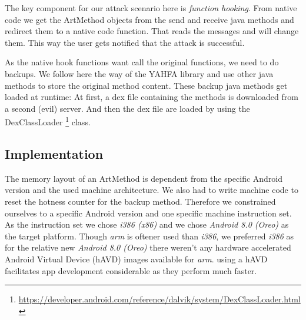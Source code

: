 The key component for our attack scenario here is \emph{function hooking}.
From native code we get the ArtMethod objects from the send and receive java methods and redirect them to a native code function. That reads the messages and will change them. This way the user gets notified that the attack is successful. 

As the native hook functions want call the original functions, we need to do backups. We follow here the way of the YAHFA library and use other java methods to store the original method content. These backup java methods get loaded at runtime: At first, a dex file containing the methods is downloaded from a second (evil) server. And then the dex file are loaded by using the DexClassLoader \footnote{\url{https://developer.android.com/reference/dalvik/system/DexClassLoader.html}}
class.






\subsection{Implementation}

The memory layout of an ArtMethod is dependent from the specific Android version and the used machine architecture. We also had to write machine code to reset the hotness counter for the backup method. Therefore we constrained ourselves to a specific Android version and one specific machine instruction set. As the instruction set we  chose \emph{i386 (x86)} and 
we chose \emph{Android 8.0 (Oreo)} as the target platform.
Though \emph{arm} is oftener used than \emph{i386}, we preferred \emph{i386} as for the relative new \emph{Android 8.0 (Oreo)} there weren't any hardware accelerated Android Virtual Device (hAVD) images available for \emph{arm}. using a hAVD facilitates app development considerable as they perform much faster. 

